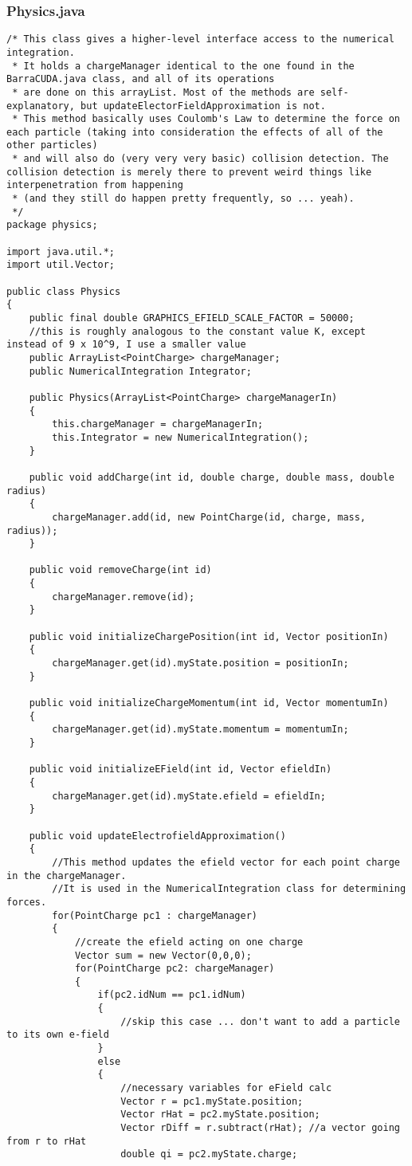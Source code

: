 \documentclass[10pt]{article}
\begin{document}
\subsubsection{Physics.java}
\begin{verbatim}
/* This class gives a higher-level interface access to the numerical integration.
 * It holds a chargeManager identical to the one found in the BarraCUDA.java class, and all of its operations
 * are done on this arrayList. Most of the methods are self-explanatory, but updateElectorFieldApproximation is not.
 * This method basically uses Coulomb's Law to determine the force on each particle (taking into consideration the effects of all of the other particles)
 * and will also do (very very very basic) collision detection. The collision detection is merely there to prevent weird things like interpenetration from happening 
 * (and they still do happen pretty frequently, so ... yeah).
 */
package physics;

import java.util.*;
import util.Vector;

public class Physics 
{
	public final double GRAPHICS_EFIELD_SCALE_FACTOR = 50000; 
	//this is roughly analogous to the constant value K, except instead of 9 x 10^9, I use a smaller value
	public ArrayList<PointCharge> chargeManager;
	public NumericalIntegration Integrator;

	public Physics(ArrayList<PointCharge> chargeManagerIn)
	{
		this.chargeManager = chargeManagerIn;
		this.Integrator = new NumericalIntegration();
	}

	public void addCharge(int id, double charge, double mass, double radius)
	{
		chargeManager.add(id, new PointCharge(id, charge, mass, radius));
	}

	public void removeCharge(int id)
	{
		chargeManager.remove(id);
	}

	public void initializeChargePosition(int id, Vector positionIn)
	{
		chargeManager.get(id).myState.position = positionIn;
	}

	public void initializeChargeMomentum(int id, Vector momentumIn)
	{
		chargeManager.get(id).myState.momentum = momentumIn;
	}

	public void initializeEField(int id, Vector efieldIn)
	{
		chargeManager.get(id).myState.efield = efieldIn;
	}

	public void updateElectrofieldApproximation()
	{
		//This method updates the efield vector for each point charge in the chargeManager.
		//It is used in the NumericalIntegration class for determining forces.
		for(PointCharge pc1 : chargeManager)
		{
			//create the efield acting on one charge
			Vector sum = new Vector(0,0,0); 
			for(PointCharge pc2: chargeManager)
			{
				if(pc2.idNum == pc1.idNum)
				{
					//skip this case ... don't want to add a particle to its own e-field
				}
				else
				{
					//necessary variables for eField calc
					Vector r = pc1.myState.position;
					Vector rHat = pc2.myState.position;
					Vector rDiff = r.subtract(rHat); //a vector going from r to rHat
					double qi = pc2.myState.charge;


\end{verbatim}
\end{document}

